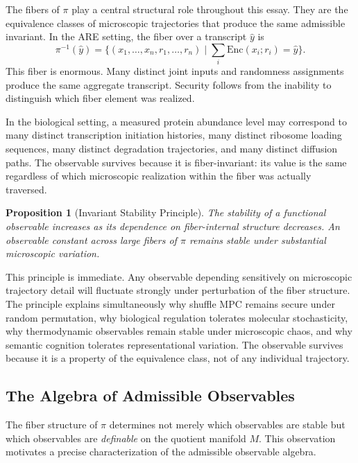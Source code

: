 \documentclass[12pt, a4paper]{article}
\theoremstyle{essaystyle}
\newtheorem{proposition}{Proposition}
\begin{document}
The fibers of $\pi$ play a central structural role throughout this essay. They are the
equivalence classes of microscopic trajectories that produce the same admissible
invariant. In the ARE setting, the fiber over a transcript $\hat{y}$ is
\[
\pi^{-1}(\hat{y})
=
\bigl\{
(x_1,\ldots,x_n,r_1,\ldots,r_n)
\;\big|\;
\textstyle\sum_i \mathrm{Enc}(x_i;r_i)=\hat{y}
\bigr\}.
\]
This fiber is enormous. Many distinct joint inputs and randomness assignments produce
the same aggregate transcript. Security follows from the inability to distinguish which
fiber element was realized.

In the biological setting, a measured protein abundance level may correspond to many
distinct transcription initiation histories, many distinct ribosome loading sequences,
many distinct degradation trajectories, and many distinct diffusion paths. The
observable survives because it is fiber-invariant: its value is the same regardless
of which microscopic realization within the fiber was actually traversed.

\begin{proposition}[Invariant Stability Principle]
The stability of a functional observable increases as its dependence on
fiber-internal structure decreases. An observable constant across large fibers of $\pi$
remains stable under substantial microscopic variation.
\end{proposition}

This principle is immediate. Any observable depending sensitively on microscopic
trajectory detail will fluctuate strongly under perturbation of the fiber structure.
The principle explains simultaneously why shuffle MPC remains secure under random
permutation, why biological regulation tolerates molecular stochasticity, why
thermodynamic observables remain stable under microscopic chaos, and why semantic
cognition tolerates representational variation. The observable survives because it is a
property of the equivalence class, not of any individual trajectory.

\subsection{The Algebra of Admissible Observables}

The fiber structure of $\pi$ determines not merely which observables are stable but
which observables are \emph{definable} on the quotient manifold $M$. This observation
motivates a precise characterization of the admissible observable algebra.
\end{document}

